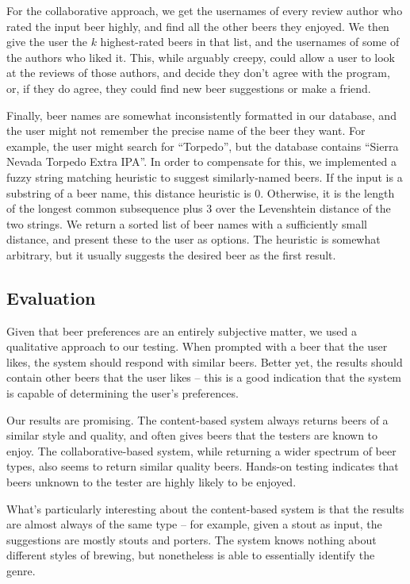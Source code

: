 \documentclass[11pt]{article}
\begin{document}
\begin{itemize}
For the collaborative approach, we get the usernames of every review author who rated the input beer highly, and find all the other beers they enjoyed. We then give the user the $k$ highest-rated beers in that list, and the usernames of some of the authors who liked it. This, while arguably creepy, could allow a user to look at the reviews of those authors, and decide they don't agree with the program, or, if they do agree, they could find new beer suggestions or make a friend.
  
  Finally, beer names are somewhat inconsistently formatted in our database, and the user might not remember the precise name of the beer they want. For example, the user might search for ``Torpedo'', but the database contains ``Sierra Nevada Torpedo Extra IPA''. In order to compensate for this, we implemented a fuzzy string matching heuristic to suggest similarly-named beers. If the input is a substring of a beer name, this distance heuristic is 0. Otherwise, it is the length of the longest common subsequence plus 3 over the Levenshtein distance of the two strings. We return a sorted list of beer names with a sufficiently small distance, and present these to the user as options. The heuristic is somewhat arbitrary, but it usually suggests the desired beer as the first result.

\end{itemize}
\subsection*{Evaluation}
Given that beer preferences are an entirely subjective matter, we used a qualitative approach to our testing. When prompted with a beer that the user likes, the system should respond with similar beers. Better yet, the results should contain other beers that the user likes -- this is a good indication that the system is capable of determining the user's preferences.

Our results are promising. The content-based system always returns beers of a similar style and quality, and often gives beers that the testers are known to enjoy. The collaborative-based system, while returning a wider spectrum of beer types, also seems to return similar quality beers. Hands-on testing indicates that beers unknown to the tester are highly likely to be enjoyed.

What's particularly interesting about the content-based system is that the results are almost always of the same type -- for example, given a stout as input, the suggestions are mostly stouts and porters. The system knows nothing about different styles of brewing, but nonetheless is able to essentially identify the genre.
\end{document}
